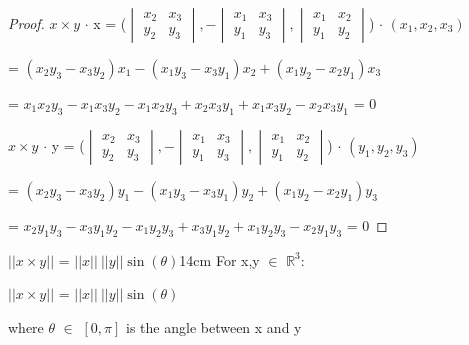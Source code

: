     \begin{proof}
        $x \times y$ $\cdot$ x =
        ($\begin{vmatrix}
            x_2 & x_3 \\
            y_2 & y_3 
        \end{vmatrix},
        - \begin{vmatrix}
            x_1 & x_3 \\
            y_1 & y_3 
        \end{vmatrix},
        \begin{vmatrix}
            x_1 & x_2 \\
            y_1 & y_2 
        \end{vmatrix}$)
        $\cdot$ $(x_1,x_2,x_3)$

        \hspace{1.6cm}
        = $(x_2y_3 - x_3y_2)x_1 - (x_1y_3 - x_3y_1)x_2 + (x_1y_2 - x_2y_1)x_3$

        \hspace{1.6cm}
        = $x_1x_2y_3 - x_1x_3y_2 - x_1x_2y_3 + x_2x_3y_1 + x_1x_3y_2 - x_2x_3y_1$
        = 0

        $x \times y$ $\cdot$ y =
        ($\begin{vmatrix}
            x_2 & x_3 \\
            y_2 & y_3 
        \end{vmatrix},
        - \begin{vmatrix}
            x_1 & x_3 \\
            y_1 & y_3 
        \end{vmatrix},
        \begin{vmatrix}
            x_1 & x_2 \\
            y_1 & y_2 
        \end{vmatrix}$)
        $\cdot$ $(y_1,y_2,y_3)$

        \hspace{1.6cm}
        = $(x_2y_3 - x_3y_2)y_1 - (x_1y_3 - x_3y_1)y_2 + (x_1y_2 - x_2y_1)y_3$

        \hspace{1.6cm}
        = $x_2y_1y_3 - x_3y_1y_2 - x_1y_2y_3 + x_3y_1y_2 + x_1y_2y_3 - x_2y_1y_3$
        = 0
    \end{proof}

    \vspace{0.5cm}



    \begin{wtheorem}{$||x \times y||$ = $||x|| \ ||y|| \sin(\theta)$}{14cm}
        For x,y $\in$ $\mathbb{R}^3$:
        
        \hspace{0.5cm}
        $||x \times y||$ = $||x|| \ ||y|| \sin(\theta)$

        where $\theta$ $\in$ $[0,\pi]$ is the angle between x and y
    \end{wtheorem}

